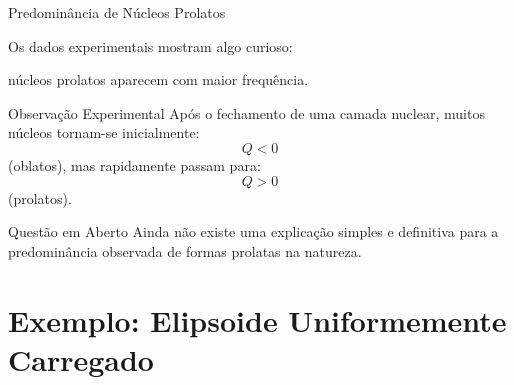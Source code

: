 \documentclass[aspectratio=169]{beamer}
\begin{document}
\begin{frame}{Predominância de Núcleos Prolatos}

\small

Os dados experimentais mostram algo curioso:

\begin{center}

\Large
núcleos prolatos aparecem com maior frequência.

\end{center}

\vspace{0.3cm}

\begin{mybox}{Observação Experimental}
Após o fechamento de uma camada nuclear,
muitos núcleos tornam-se inicialmente:
\[
Q<0
\]
(oblatos),
mas rapidamente passam para:
\[
Q>0
\]
(prolatos).
\end{mybox}

\end{frame}

\begin{frame}

\begin{alertblock}{Questão em Aberto}
Ainda não existe uma explicação simples e definitiva
para a predominância observada de formas prolatas na natureza.
\end{alertblock}

\end{frame}

\section{Exemplo: Elipsoide Uniformemente Carregado}
\end{document}
